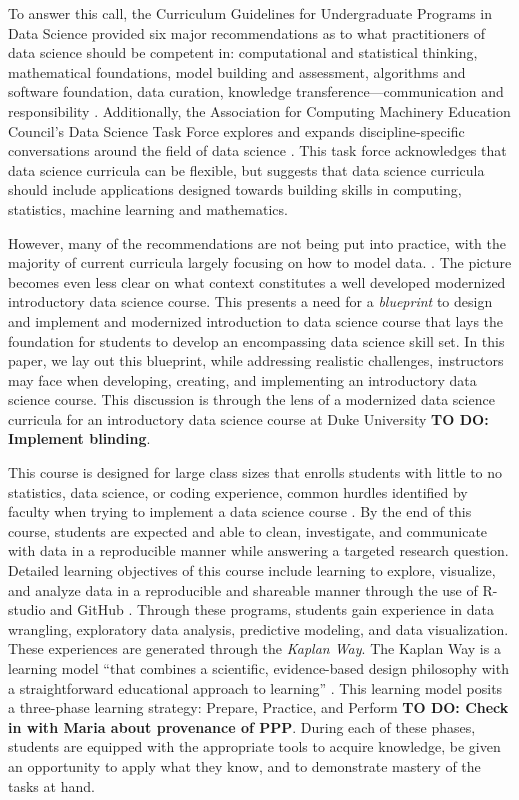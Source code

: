 \documentclass[
  12pt]{article}
\begin{document}
To answer this call, the Curriculum Guidelines for Undergraduate
Programs in Data Science provided six major recommendations as to what
practitioners of data science should be competent in: computational and
statistical thinking, mathematical foundations, model building and
assessment, algorithms and software foundation, data curation, knowledge
transference---communication and responsibility \citep{veaux_2017}.
Additionally, the Association for Computing Machinery Education
Council's Data Science Task Force explores and expands
discipline-specific conversations around the field of data science
\citep{Danyluk_2021}. This task force acknowledges that data science
curricula can be flexible, but suggests that data science curricula
should include applications designed towards building skills in
computing, statistics, machine learning and mathematics.

However, many of the recommendations are not being put into practice,
with the majority of current curricula largely focusing on how to model
data. \citep{Donoho2017}. The picture becomes even less clear on what
context constitutes a well developed modernized introductory data
science course. This presents a need for a \emph{blueprint} to design
and implement and modernized introduction to data science course that
lays the foundation for students to develop an encompassing data science
skill set. In this paper, we lay out this blueprint, while addressing
realistic challenges, instructors may face when developing, creating,
and implementing an introductory data science course. This discussion is
through the lens of a modernized data science curricula for an
introductory data science course at Duke University \textbf{TO DO:
Implement blinding}.

This course is designed for large class sizes that enrolls students with
little to no statistics, data science, or coding experience, common
hurdles identified by faculty when trying to implement a data science
course \citep{Schwab2020}. By the end of this course, students are
expected and able to clean, investigate, and communicate with data in a
reproducible manner while answering a targeted research question.
Detailed learning objectives of this course include learning to explore,
visualize, and analyze data in a reproducible and shareable manner
through the use of R-studio and GitHub \citep{R21, github}. Through
these programs, students gain experience in data wrangling, exploratory
data analysis, predictive modeling, and data visualization. These
experiences are generated through the \emph{Kaplan Way}. The Kaplan Way
is a learning model ``that combines a scientific, evidence-based design
philosophy with a straightforward educational approach to learning''
\citep{schweser_2023}. This learning model posits a three-phase learning
strategy: Prepare, Practice, and Perform \textbf{TO DO: Check in with
Maria about provenance of PPP}. During each of these phases, students
are equipped with the appropriate tools to acquire knowledge, be given
an opportunity to apply what they know, and to demonstrate mastery of
the tasks at hand.
\end{document}
